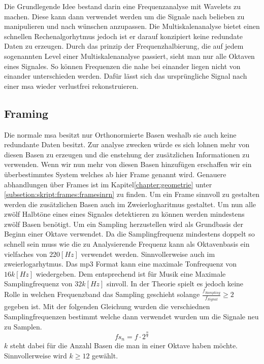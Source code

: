 



Die Grundlegende Idee bestand darin eine Frequenzanalyse mit Wavelets zu machen. Diese kann dann verwendet werden um die Signale nach belieben zu manipulieren und nach wünschen anzupassen. Die Multiskalenanalyse bietet einen schnellen Rechenalgorhytmus jedoch ist er darauf konzipiert keine redundate Daten zu erzeugen. Durch das prinzip der Frequenzhalbierung, die auf jedem sogenannten Level einer Multiskalenanalyse passiert, sieht man nur alle Oktaven eines Signales. So können Frequenzen die nahe bei einander liegen nicht von einander unterschieden werden. Dafür lässt sich das ursprüngliche Signal nach einer msa wieder verlustfrei rekonstruieren. 

\subsection{Framing}
Die normale msa besitzt nur Orthonormierte Basen weshalb sie auch keine redundante Daten besitzt. Zur analyse zwecken würde es sich lohnen mehr von diesen Basen zu erzeugen und die enstehung der zusätzlichen Informationen zu verwenden. Wenn wir nun mehr von diesen Basen hinzufügen erschaffen wir ein überbestimmtes System welches ab hier Frame genannt wird. Genauere abhandlungen über Frames ist im Kapitel\ref{chapter:geometrie} unter \ref{subsetion:skript:frames:framesinrn} zu finden. Um ein Frame sinnvoll zu gestalten werden die zusätzlichen Basen auch im Zweierlogharitmus gestaltet. Um nun alle zwölf Halbtöne eines eines Signales detektieren zu können werden mindestens zwölf Basen benötigt. Um ein Sampling herzustellen wird als Grundbasis der Beginn einer Oktave verwendet. Da die Samplingfrequenz mindestens doppelt so schnell sein muss wie die zu Analysierende Frequenz kann als Oktavenbasis ein vielfaches von $220[Hz]$ verwendet werden. Sinnvollerweise auch im zweierlogarhytmus. Das mp3 Format kann eine maximale Tonfrequenz von $16k[Hz]$ wiedergeben. Dem entsprechend ist für Musik eine Maximale Samplingfrequenz von $32k[Hz]$ sinvoll. In der Theorie spielt es jedoch keine Rolle in welchen Frequenzband das Sampling geschieht solange $\frac{f_{Sampling}}{f_{Signal}}\geq2$ gegeben ist. Mit der folgenden Gleichung wurden die verschiednen Samplingfrequenzen bestimmt welche dann verwendet wurden um die Signale neu zu Samplen. 
\begin{equation}
fs_{n}=f\cdot2^{\frac{n}{k}}
\end{equation}
$k$ steht dabei für die Anzahl Basen die man in einer Oktave haben möchte. Sinnvollerweise wird $k \geq 12$ gewählt.\\

